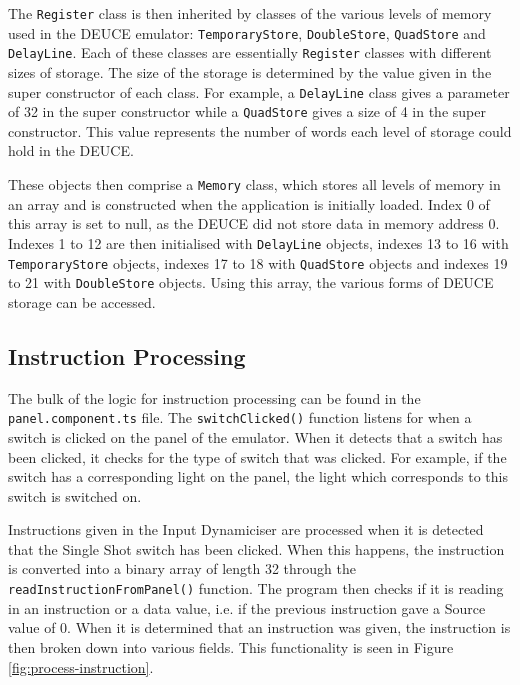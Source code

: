 \documentclass{l4proj}
\begin{document}
The \texttt{Register} class is then inherited by classes of the various levels of memory used in the DEUCE emulator: \texttt{TemporaryStore}, \texttt{DoubleStore}, \texttt{QuadStore} and \texttt{DelayLine}. Each of these classes are essentially \texttt{Register} classes with different sizes of storage. The size of the storage is determined by the value given in the super constructor of each class. For example, a \texttt{DelayLine} class gives a parameter of 32 in the super constructor while a \texttt{QuadStore} gives a size of 4 in the super constructor. This value represents the number of words each level of storage could hold in the DEUCE.

These objects then comprise a \texttt{Memory} class, which stores all levels of memory in an array and is constructed when the application is initially loaded. Index 0 of this array is set to null, as the DEUCE did not store data in memory address 0. Indexes 1 to 12 are then initialised with \texttt{DelayLine} objects, indexes 13 to 16 with \texttt{TemporaryStore} objects, indexes 17 to 18 with \texttt{QuadStore} objects and indexes 19 to 21 with \texttt{DoubleStore} objects. Using this array, the various forms of DEUCE storage can be accessed.

\subsection{Instruction Processing}
The bulk of the logic for instruction processing can be found in the \texttt{panel.component.ts} file. The \texttt{switchClicked()} function listens for when a switch is clicked on the panel of the emulator. When it detects that a switch has been clicked, it checks for the type of switch that was clicked. For example, if the switch has a corresponding light on the panel, the light which corresponds to this switch is switched on. 

Instructions given in the Input Dynamiciser are processed when it is detected that the Single Shot switch has been clicked. When this happens, the instruction is converted into a binary array of length 32 through the \texttt{readInstructionFromPanel()} function. The program then checks if it is reading in an instruction or a data value, i.e. if the previous instruction gave a Source value of 0. When it is determined that an instruction was given, the instruction is then broken down into various fields. This functionality is seen in Figure \ref{fig:process-instruction}.
\end{document}
